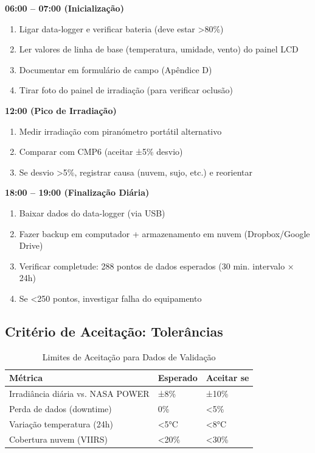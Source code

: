 \documentclass[12pt, a4paper]{article}
\begin{document}
\textbf{06:00 – 07:00 (Inicialização)}
\begin{enumerate}
\item Ligar data-logger e verificar bateria (deve estar >80\%)
\item Ler valores de linha de base (temperatura, umidade, vento) do painel LCD
\item Documentar em formulário de campo (Apêndice D)
\item Tirar foto do painel de irradiação (para verificar oclusão)
\end{enumerate}

\textbf{12:00 (Pico de Irradiação)}
\begin{enumerate}
\item Medir irradiação com piranómetro portátil alternativo
\item Comparar com CMP6 (aceitar ±5\% desvio)
\item Se desvio >5\%, registrar causa (nuvem, sujo, etc.) e reorientar
\end{enumerate}

\textbf{18:00 – 19:00 (Finalização Diária)}
\begin{enumerate}
\item Baixar dados do data-logger (via USB)
\item Fazer backup em computador + armazenamento em nuvem (Dropbox/Google Drive)
\item Verificar completude: 288 pontos de dados esperados (30 min. intervalo × 24h)
\item Se <250 pontos, investigar falha do equipamento
\end{enumerate}

\subsection{Critério de Aceitação: Tolerâncias}

\begin{table}[H]
\centering
\caption{Limites de Aceitação para Dados de Validação}
\label{tab:acceptance_criteria}
\small
\begin{tabular}{|l|l|l|}
\hline
\textbf{Métrica} & \textbf{Esperado} & \textbf{Aceitar se} \\
\hline
Irradiância diária vs. NASA POWER & ±8\% & ±10\% \\
Perda de dados (downtime) & 0\% & <5\% \\
Variação temperatura (24h) & <5°C & <8°C \\
Cobertura nuvem (VIIRS) & <20\% & <30\% \\
\hline
\end{tabular}
\end{table}
\end{document}
